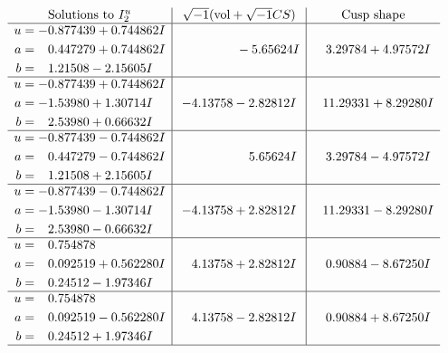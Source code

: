 \documentclass[1p]{elsarticle_modified}
\theoremstyle{definition}
\newcommand{\I}{\sqrt{-1}}
\begin{document}
$$\begin{array}{c|c|c}  
\text{Solutions to }I^u_{2}& \I (\text{vol} + \sqrt{-1}CS) & \text{Cusp shape}\\
 \hline 
\begin{aligned}
u &= -0.877439 + 0.744862 I \\
a &= \phantom{-}0.447279 + 0.744862 I \\
b &= \phantom{-}1.21508 - 2.15605 I\end{aligned}
 & \phantom{-0.000000 } -5.65624 I & \phantom{-}3.29784 + 4.97572 I \\ \hline\begin{aligned}
u &= -0.877439 + 0.744862 I \\
a &= -1.53980 + 1.30714 I \\
b &= \phantom{-}2.53980 + 0.66632 I\end{aligned}
 & -4.13758 - 2.82812 I & \phantom{-}11.29331 + 8.29280 I \\ \hline\begin{aligned}
u &= -0.877439 - 0.744862 I \\
a &= \phantom{-}0.447279 - 0.744862 I \\
b &= \phantom{-}1.21508 + 2.15605 I\end{aligned}
 & \phantom{-0.000000 -}5.65624 I & \phantom{-}3.29784 - 4.97572 I \\ \hline\begin{aligned}
u &= -0.877439 - 0.744862 I \\
a &= -1.53980 - 1.30714 I \\
b &= \phantom{-}2.53980 - 0.66632 I\end{aligned}
 & -4.13758 + 2.82812 I & \phantom{-}11.29331 - 8.29280 I \\ \hline\begin{aligned}
u &= \phantom{-}0.754878\phantom{ +0.000000I} \\
a &= \phantom{-}0.092519 + 0.562280 I \\
b &= \phantom{-}0.24512 - 1.97346 I\end{aligned}
 & \phantom{-}4.13758 + 2.82812 I & \phantom{-}0.90884 - 8.67250 I \\ \hline\begin{aligned}
u &= \phantom{-}0.754878\phantom{ +0.000000I} \\
a &= \phantom{-}0.092519 - 0.562280 I \\
b &= \phantom{-}0.24512 + 1.97346 I\end{aligned}
 & \phantom{-}4.13758 - 2.82812 I & \phantom{-}0.90884 + 8.67250 I\\
 \hline 
 \end{array}$$\newpage\newpage\renewcommand{\arraystretch}{1}
\end{document}
